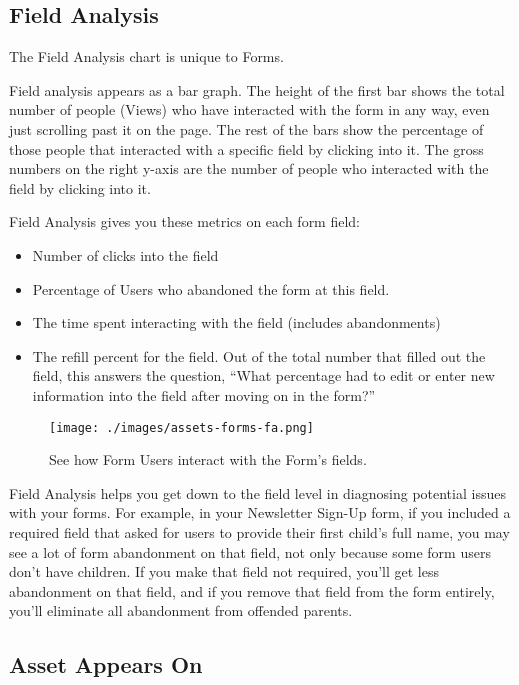 \subsection{Field Analysis}\label{field-analysis}

The Field Analysis chart is unique to Forms.

Field analysis appears as a bar graph. The height of the first bar shows
the total number of people (Views) who have interacted with the form in
any way, even just scrolling past it on the page. The rest of the bars
show the percentage of those people that interacted with a specific
field by clicking into it. The gross numbers on the right y-axis are the
number of people who interacted with the field by clicking into it.

Field Analysis gives you these metrics on each form field:

\begin{itemize}
\item
  Number of clicks into the field
\item
  Percentage of Users who abandoned the form at this field.
\item
  The time spent interacting with the field (includes abandonments)
\item
  The refill percent for the field. Out of the total number that filled
  out the field, this answers the question, ``What percentage had to
  edit or enter new information into the field after moving on in the
  form?''
\end{itemize}

\begin{figure}
\centering
\texttt{[image: ./images/assets-forms-fa.png]}
\caption{See how Form Users interact with the Form's fields.}
\end{figure}

Field Analysis helps you get down to the field level in diagnosing
potential issues with your forms. For example, in your Newsletter
Sign-Up form, if you included a required field that asked for users to
provide their first child's full name, you may see a lot of form
abandonment on that field, not only because some form users don't have
children. If you make that field not required, you'll get less
abandonment on that field, and if you remove that field from the form
entirely, you'll eliminate all abandonment from offended parents.

\subsection{Asset Appears On}\label{asset-appears-on}

